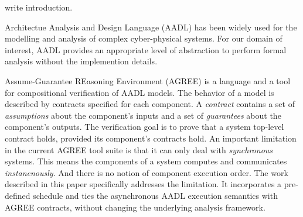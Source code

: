 write introduction.

Architectue Analysis and Design Language (AADL) has been widely used for the modelling and analysis of complex cyber-physical systems. For our domain of interest, AADL provides an appropriate level of abstraction to perform formal analysis without the implemention details.

Assume-Guarantee REasoning Environment (AGREE)\cite{8625938} is a language and a tool for compositional verification of AADL models. The behavior of a model is described by contracts specified for each component. A \emph{contract} contains a set of \emph{assumptions} about the component's inputs and a set of \emph{guarantees} about the component's outputs. The verification goal is to prove that a system top-level contract holds, provided its component's contracts hold.
%
An important limitation in the current AGREE tool suite is that it can only deal with \emph{synchronous} systems. This means the components of a system computes and communicates \emph{instanenously}. And there is no notion of component execution order. The work described in this paper specifically addresses the limitation. It incorporates a pre-defined schedule and ties the asynchronous AADL execution semantics with AGREE contracts, without changing the underlying analysis framework.


